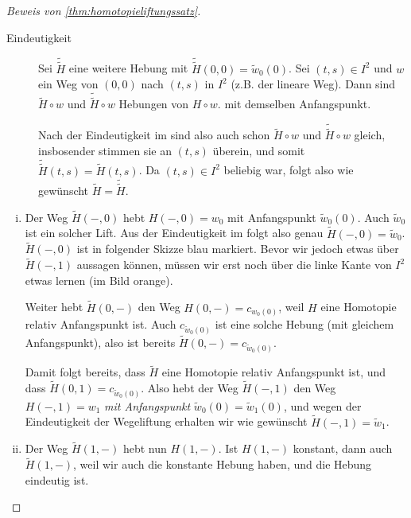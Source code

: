 \begin{proof}[Beweis von \autoref{thm:homotopieliftungssatz}]
\begin{description}
\item[Eindeutigkeit] Sei $\tilde{\tilde{H}}$ eine weitere Hebung mit $\tilde{\tilde{H}} (0,0) = \tilde{w}_0(0)$. Sei $(t,s) \in I^2$ und $w$ ein Weg von  $(0,0)$ nach  $(t,s)$ in  $I^2$ (z.B. der lineare Weg). Dann sind $\tilde{H} \circ w$ und $\tilde{\tilde{H}} \circ  w$ Hebungen von $H\circ  w$. mit demselben Anfangspunkt. 

    Nach der Eindeutigkeit im  sind also auch schon $\tilde{H} \circ w$ und $\tilde{\tilde{H}} \circ w$ gleich, insbosender stimmen sie an $(t,s)$ überein, und somit  $\tilde{\tilde{H}}(t,s) = \tilde{H}(t,s) $. Da $(t,s)\in I^2$ beliebig war, folgt also wie gewünscht $\tilde{H} = \tilde{\tilde{H}} $.
\end{description}
\begin{enumerate}[i)]
\item Der Weg $\tilde{H}(-,0)$ hebt $H(-,0)= w_0$ mit Anfangspunkt $\tilde{w}_0(0)$. Auch $\tilde{w}_0$ ist ein solcher Lift. Aus der Eindeutigkeit im  folgt also genau $\tilde{H}(-,0) = \tilde{w}_0$. $\tilde{H}(-,0)$ ist in folgender Skizze blau markiert. Bevor wir jedoch etwas über $\tilde{H}(-,1)$ aussagen können, müssen wir erst noch über die linke Kante von $I^2$ etwas lernen (im Bild orange).

    \begin{minipage}{\textwidth}
        \centering
    \end{minipage}

    Weiter hebt $\tilde{H}(0,-)$ den Weg $H(0,-) = c_{w_0(0)}$, weil $H$ eine Homotopie relativ Anfangspunkt ist. Auch  $c_{\tilde{w}_0(0)}$ ist eine solche Hebung (mit gleichem Anfangspunkt), also ist bereits $\tilde{H}(0,-) = c_{\tilde{w}_0(0)}$.

    Damit folgt bereits, dass $\tilde{H}$ eine Homotopie relativ Anfangspunkt ist, und dass $\tilde{H}(0,1) = c_{\tilde{w}_0(0)}$. Also hebt der Weg $\tilde{H}(-,1)$ den Weg $H(-,1) = w_1$ \textit{mit Anfangspunkt} $\tilde{w}_0(0) = \tilde{w}_1(0)$, und wegen der Eindeutigkeit der Wegeliftung erhalten wir wie gewünscht $\tilde{H}(-,1) = \tilde{w}_1$.
\item Der Weg $\tilde{H}(1,-)$ hebt nun $H(1,-)$. Ist  $H(1,-)$ konstant, dann auch  $\tilde{H}(1,-)$, weil wir auch die konstante Hebung haben, und die Hebung eindeutig ist.
\end{enumerate}
\end{proof}
